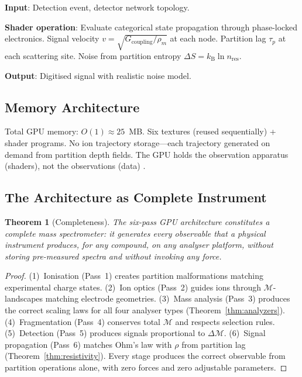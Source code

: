 \documentclass[11pt,twocolumn,a4paper]{article}
\newtheorem{theorem}{Theorem}[section]
\theoremstyle{definition}
\theoremstyle{remark}
\newcommand{\kB}{k_{\mathrm{B}}}
\newcommand{\Depth}{\mathcal{M}}
\newcommand{\taup}{\tau_p}
\begin{document}
\textbf{Input}: Detection event, detector network topology.

\textbf{Shader operation}: Evaluate categorical state propagation through phase-locked electronics. Signal velocity $v = \sqrt{G_{\mathrm{coupling}}/\rho_m}$ at each node. Partition lag $\taup$ at each scattering site. Noise from partition entropy $\Delta S = \kB\ln n_{\mathrm{res}}$.

\textbf{Output}: Digitised signal with realistic noise model.

\subsection{Memory Architecture}

Total GPU memory: $O(1) \approx 25$~MB. Six textures (reused sequentially) + shader programs. No ion trajectory storage---each trajectory generated on demand from partition depth fields. The GPU holds the observation apparatus (shaders), not the observations (data) \citep{khronos2017}.

\subsection{The Architecture as Complete Instrument}

\begin{theorem}[Completeness]
\label{thm:completeness}
The six-pass GPU architecture constitutes a complete mass spectrometer: it generates every observable that a physical instrument produces, for any compound, on any analyser platform, without storing pre-measured spectra and without invoking any force.
\end{theorem}

\begin{proof}
(1)~Ionisation (Pass~1) creates partition malformations matching experimental charge states. (2)~Ion optics (Pass~2) guides ions through $\Depth$-landscapes matching electrode geometries. (3)~Mass analysis (Pass~3) produces the correct scaling laws for all four analyser types (Theorem~\ref{thm:analyzers}). (4)~Fragmentation (Pass~4) conserves total $\Depth$ and respects selection rules. (5)~Detection (Pass~5) produces signals proportional to $\Delta\Depth$. (6)~Signal propagation (Pass~6) matches Ohm's law with $\rho$ from partition lag (Theorem~\ref{thm:resistivity}). Every stage produces the correct observable from partition operations alone, with zero forces and zero adjustable parameters.
\end{proof}
\end{document}
